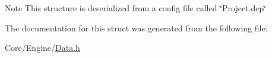 \begin{DoxyNote}{Note}
This structure is deserialized from a config file called \char`\"{}\-Project.\-dcp\char`\"{} 
\end{DoxyNote}


The documentation for this struct was generated from the following file\-:\begin{DoxyCompactItemize}
\item 
Core/\-Engine/\hyperlink{Data_8h}{Data.\-h}\end{DoxyCompactItemize}
